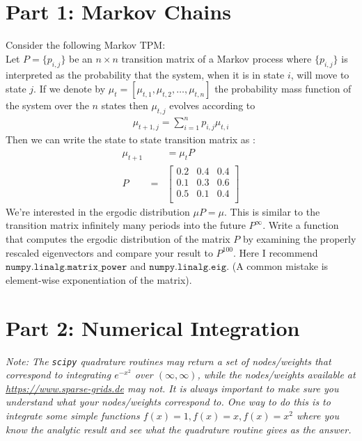 \documentclass{article}
\begin{document}
\section*{Part 1: Markov Chains}
Consider the following Markov TPM:\\
Let $P = \{p_{i,j} \}$ be an $n \times n$ transition matrix of a Markov process where $\{p_{i,j} \}$ is interpreted as the probability that the system, when it is in state $i$, will move to state $j$. If we denote by $\mu_t = [ \mu_{t,1} , \mu_{t,2}, \ldots, \mu_{t,n}]$ the probability mass function of the system over the $n$ states then $\mu_{t,j}$ evolves according to
\begin{eqnarray*}
\mu_{t+1,j} = \sum_{i=1}^n p_{i,j} \mu_{t,i}
\end{eqnarray*}
Then we can write the state to state transition matrix as :
\begin{eqnarray*}
\mu_{t+1}& &= \mu_t P \\
P &=&
\left[ {\begin{array}{ccc}
    0.2&    0.4&    0.4\\
    0.1&    0.3&    0.6\\
    0.5&    0.1&    0.4\\
 \end{array} } \right]
\end{eqnarray*}
We're interested in the ergodic distribution $\mu P = \mu$. This is similar to the transition matrix infinitely many periods into the future $P^{\infty}$. Write a function that computes the ergodic distribution of the matrix $P$ by examining the properly rescaled eigenvectors and compare your result to $P^{100}$. Here I recommend $\mathtt{numpy.linalg.matrix\_power}$ and $\mathtt{numpy.linalg.eig}$. (A common mistake is element-wise exponentiation of the matrix).


\section*{Part 2: Numerical Integration}
\textit{Note: The \texttt{scipy} quadrature routines may return a set of nodes/weights that correspond to integrating $e^{-x^2}$ over $(\infty,\infty)$, while the nodes/weights available at \url{https://www.sparse-grids.de} may not. It is always important to make sure you understand what your nodes/weights correspond to. One way to do this is to integrate some simple functions $f(x)=1,f(x)=x,f(x)=x^2$ where you know the analytic result and see what the quadrature routine gives as the answer.}\\
\end{document}
